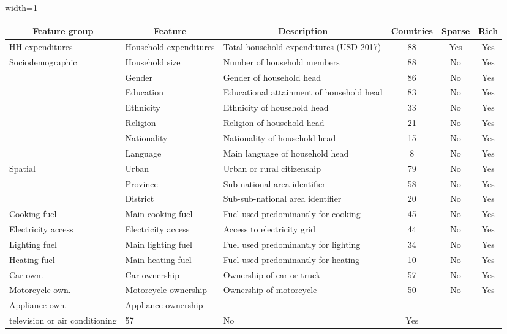\begin{table}[ht!]
  \centering
\begin{adjustbox}{width=1\textwidth}
\begin{tabular}[]{l|l|l|c|c|c}
\toprule
\multicolumn{1}{c}{Feature group} & \multicolumn{1}{c}{Feature} & \multicolumn{1}{c}{Description} & \multicolumn{1}{c}{Countries} & \multicolumn{1}{c}{Sparse} & \multicolumn{1}{c}{Rich} \\ \hline
     
        HH expenditures & Household expenditures & Total household expenditures (USD 2017) & 88 & Yes & Yes \\ \hline
        Sociodemographic & Household size & Number of household members & 88 & No & Yes \\ 
         & Gender & Gender of household head & 86 & No & Yes\\ 
         & Education & Educational attainment of household head & 83 & No & Yes\\
         & Ethnicity & Ethnicity of household head & 33 & No & Yes\\
         & Religion & Religion of household head & 21 & No & Yes\\
         & Nationality & Nationality of household head & 15 & No & Yes\\
         & Language & Main language of household head & 8 & No & Yes \\ \hline

         Spatial & Urban & Urban or rural citizenship & 79 & No & Yes\\
        & Province & Sub-national area identifier & 58 & No & Yes\\
        & District & Sub-sub-national area identifier & 20 & No & Yes\\ \hline
        Cooking fuel & Main cooking fuel & Fuel used predominantly for cooking & 45 & No & Yes\\
        Electricity access & Electricity access & Access to electricity grid & 44 & No & Yes\\
        Lighting fuel & Main lighting fuel & Fuel used predominantly for lighting & 34 & No & Yes\\
        Heating fuel & Main heating fuel & Fuel used predominantly for heating & 10 & No & Yes\\
        Car own. & Car ownership & Ownership of car or truck & 57 & No & Yes\\
        Motorcycle own. & Motorcycle ownership & Ownership of motorcycle & 50 & No & Yes\\
        Appliance own. & Appliance ownership & \makecell[tl]{Ownership of refrigerator, washing machine, \\ television or air conditioning} & 57 & No & Yes\\
        \bottomrule
\end{tabular}


\end{adjustbox}
\end{table}
